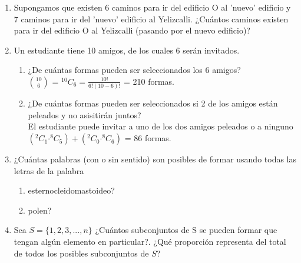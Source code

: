 \documentclass[12pt,a4paper]{report}
\newcommand*{\Comb}[2]{{}^{#1}C_{#2}}
\begin{document}
\begin{enumerate}
   \item {
   Supongamos que existen 6 caminos para ir del edificio O al ’nuevo’
   edificio y 7 caminos para ir del ’nuevo’ edificio al Yelizcalli.
   ¿Cuántos caminos existen para ir del edificio O al Yelizcalli
   (pasando por el nuevo edificio)?\\


	}

   \item {
    Un estudiante tiene 10 amigos, de los cuales 6 serán invitados.\\
		\begin{enumerate}
		\item{
		¿De cuántas formas pueden ser seleccionados los 6 amigos?\\

		$10 \choose 6 $ = $\Comb{10}{6}=\frac{10!}{6!(10-6)!}$ = 210 formas.\\
		}

		\item{
        ¿De cuántas formas pueden ser seleccionados si 2 de los amigos están
        peleados y no asisitirán juntos?\\

        El estudiante puede invitar a uno de los dos amigos peleados o a ninguno \\

         $(\Comb{2}{1} \boldsymbol{\cdot} \Comb{8}{5}) +(\Comb{2}{0} \boldsymbol{\cdot} \Comb{8}{6})$ = 86 formas.\\
		}
	\end{enumerate}
	}


   \item {
    ¿Cuántas palabras (con o sin sentido) son posibles de formar usando todas
    las letras de la palabra\\

	\begin{enumerate}
   \item {
	esternocleidomastoideo?\\

   }

   \item {
   polen?\\

   }
	\end{enumerate}

	}

   \item {
    Sea $S = \{1, 2, 3, ... , n\}$ ¿Cuántos subconjuntos de S se pueden
    formar que tengan algún elemento en particular?. ¿Qué proporción
    representa del total de todos los posibles subconjuntos de $S$?\\\\

}
\end{enumerate}
\end{document}
